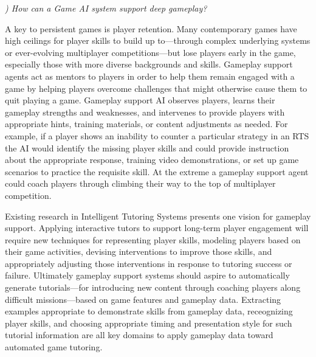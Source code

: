 \documentclass[conference]{IEEEtran}
\newcounter{questionno}
\newcommand{\subsubsectionx}[1]{{\em {\arabic{questionno}) #1}}
	\addtocounter{questionno}{1}
	}
\begin{document}
\subsubsectionx{How can a Game AI system support deep gameplay?}
A key to persistent games is player retention.
Many contemporary games have high ceilings for player skills to build up to---through complex underlying systems or ever-evolving multiplayer competitions---but lose players early in the game, especially those with more diverse backgrounds and skills.
Gameplay support agents act as mentors to players in order to help them remain engaged with a game by helping players overcome challenges that might otherwise cause them to quit playing a game. 
Gameplay support AI observes players, learns their gameplay strengths and weaknesses, and intervenes to provide players with appropriate hints, training materials, or content adjustments as needed. 
For example, if a player shows an inability to counter a particular strategy in an RTS the AI would identify the missing player skills and could provide instruction about the appropriate response, training video demonstrations, or set up game scenarios to practice the requisite skill. 
At the extreme a gameplay support agent could coach players through climbing their way to the top of multiplayer competition.


Existing research in Intelligent Tutoring Systems \cite{vanlehn2006:behav-its} presents one vision for gameplay support. 
Applying interactive tutors to support long-term player engagement will require new techniques for representing player skills, modeling players based on their game activities, devising interventions to improve those skills, and appropriately adjusting those interventions in response to tutoring success or failure. 
Ultimately gameplay support systems should aspire to automatically generate tutorials---for introducing new content through coaching players along difficult missions---based on game features and gameplay data. Extracting examples appropriate to demonstrate skills from gameplay data, receognizing player skills, and choosing appropriate timing and presentation style for such tutorial information are all key domains to apply gameplay data toward automated game tutoring.
\end{document}
